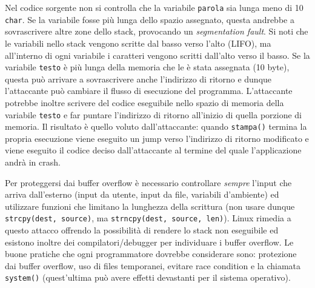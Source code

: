 Nel codice sorgente non si controlla che la variabile \texttt{parola} sia lunga meno di 10 \texttt{char}. Se la variabile fosse più lunga dello spazio assegnato, questa andrebbe a sovrascrivere altre zone dello stack, provocando un \textit{segmentation fault}. Si noti che le variabili nello stack vengono scritte dal basso verso l'alto (LIFO), ma all'interno di ogni variabile i caratteri vengono scritti dall'alto verso il basso. Se la variabile \texttt{testo} è più lunga della memoria che le è stata assegnata (10 byte), questa può arrivare a sovrascrivere anche l'indirizzo di ritorno e dunque l'attaccante può cambiare il flusso di esecuzione del programma. L'attaccante potrebbe inoltre scrivere del codice eseguibile nello spazio di memoria della variabile \texttt{testo} e far puntare l'indirizzo di ritorno all'inizio di quella porzione di memoria. Il risultato è quello voluto dall'attaccante: quando \texttt{stampa()} termina la propria esecuzione viene eseguito un jump verso l'indirizzo di ritorno modificato e viene eseguito il codice deciso dall'attaccante al termine del quale l'applicazione andrà in crash.

Per proteggersi dai buffer overflow è necessario controllare \textit{sempre} l'input che arriva dall'esterno (input da utente, input da file, variabili d'ambiente) ed utilizzare funzioni che limitano la lunghezza della scrittura (non usare dunque \texttt{strcpy(dest, source)}, ma \texttt{strncpy(dest, source, len)}). Linux rimedia a questo attacco offrendo la possibilità di rendere lo stack non eseguibile ed esistono inoltre dei compilatori/debugger per individuare i buffer overflow. Le buone pratiche che ogni programmatore dovrebbe considerare sono: protezione dai buffer overflow, uso di files temporanei, evitare race condition e la chiamata \texttt{system()} (quest'ultima può avere effetti devastanti per il sistema operativo).

